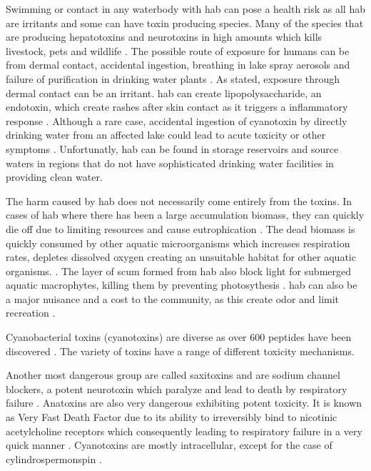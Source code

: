 
Swimming or contact in any waterbody with \gls{hab} can pose a health risk as all \gls{hab} are irritants and some can have toxin producing species. Many of the species that are producing hepatotoxins and neurotoxins in high amounts which kills livestock, pets and wildlife \cite{anderson_harmful_2002}. The possible route of exposure  for humans can be from dermal contact, accidental ingestion, breathing in lake spray aerosols and failure of purification in drinking water plants \cite{may_aerosol_2018,codd_cyanobacterial_1999}. As stated, exposure through dermal contact can be an irritant. \gls{hab} can create lipopolysaccharide, an endotoxin, which create rashes after skin contact as it triggers a inflammatory response \cite{ moore_richard_cyanobacterial_1993}. Although a rare case, accidental ingestion of cyanotoxin by directly drinking water from an affected lake could  lead to acute toxicity or other symptoms \cite{monks_potent_2007}. Unfortunatly, \gls{hab} can be found in storage reservoirs and source waters in regions that do not have sophisticated drinking water facilities in providing clean water. %

The harm caused by \gls{hab} does not necessarily come entirely from the toxins. In cases of \gls{hab} where there has been a large accumulation biomass, they can quickly die off due to limiting resources and cause eutrophication \cite{charlton_oxygen_1980}. The dead biomass is quickly consumed by other aquatic microorganisms which increases respiration rates, depletes dissolved oxygen creating an unsuitable habitat for other aquatic organisms.  \cite{anderson_harmful_2002}.
The layer of scum formed from \gls{hab} also block light for submerged aquatic macrophytes, killing them by preventing photosythesis \cite{ bucak_modeling_2018}. \gls{hab} can also be a major nuisance and a cost to the community, as this create odor and limit recreation \cite{graham_cyanotoxin_2010, carmichael_health_2016}.


Cyanobacterial toxins (cyanotoxins) are diverse as over 600 peptides have been discovered \cite{welker_cyanobacterial_2006}. The variety of toxins have a range of different toxicity mechanisms.

Another most dangerous group are called saxitoxins and are sodium channel blockers, a potent neurotoxin which paralyze and lead to death by respiratory failure \cite{moore_richard_cyanobacterial_1993}.
Anatoxins are also very dangerous exhibiting potent toxicity. It is known as Very Fast Death Factor due to its ability to irreversibly bind to nicotinic acetylcholine receptors which consequently leading to respiratory failure in a very quick manner \cite{codd_cyanobacterial_1999, moore_richard_cyanobacterial_1993}. Cyanotoxins are mostly intracellular, except for the case of cylindrospermonspin \cite{rastogi_cyanotoxin-microcystins:_2014}.




